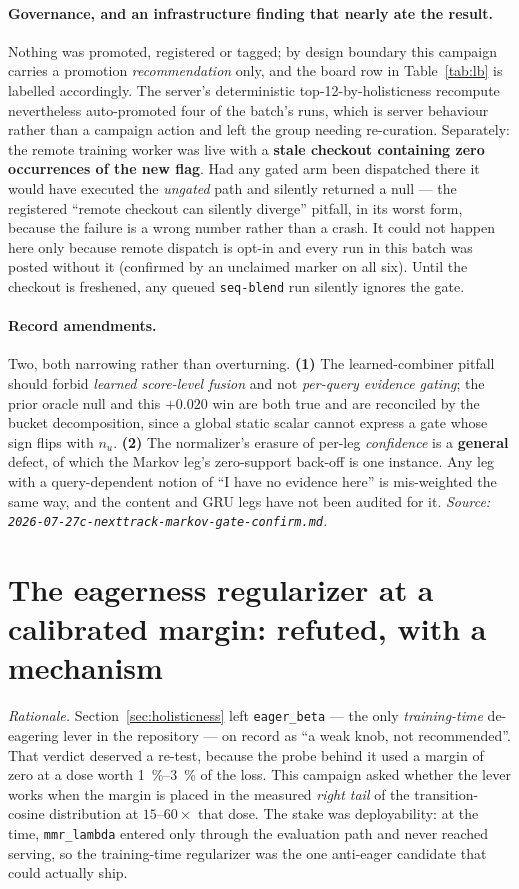 \documentclass[11pt]{article}
\begin{document}
\paragraph{Governance, and an infrastructure finding that nearly ate the result.}
Nothing was promoted, registered or tagged; by design boundary this campaign
carries a promotion \emph{recommendation} only, and the board row in
Table~\ref{tab:lb} is labelled accordingly. The server's deterministic
top-12-by-holisticness recompute nevertheless auto-promoted four of the batch's
runs, which is server behaviour rather than a campaign action and left the group
needing re-curation. Separately: the remote training worker was live with a
\textbf{stale checkout containing zero occurrences of the new flag}. Had any gated
arm been dispatched there it would have executed the \emph{ungated} path and
silently returned a null --- the registered ``remote checkout can silently diverge''
pitfall, in its worst form, because the failure is a wrong number rather than a
crash. It could not happen here only because remote dispatch is opt-in and every
run in this batch was posted without it (confirmed by an unclaimed marker on all
six). Until the checkout is freshened, any queued \texttt{seq-blend} run silently
ignores the gate.

\paragraph{Record amendments.} Two, both narrowing rather than overturning.
\textbf{(1)} The learned-combiner pitfall should forbid \emph{learned score-level
fusion} and not \emph{per-query evidence gating}; the prior oracle null and this
$+\num{0.020}$ win are both true and are reconciled by the bucket decomposition,
since a global static scalar cannot express a gate whose sign flips with $n_u$.
\textbf{(2)} The normalizer's erasure of per-leg \emph{confidence} is a
\textbf{general} defect, of which the Markov leg's zero-support back-off is one
instance. Any leg with a query-dependent notion of ``I have no evidence here'' is
mis-weighted the same way, and the content and GRU legs have not been audited for
it.
\emph{Source: \texttt{2026-07-27c-nexttrack-markov-gate-confirm.md}.}

\section{The eagerness regularizer at a calibrated margin: refuted, with a mechanism}
\label{sec:eagermargin}
\emph{Rationale.} Section~\ref{sec:holisticness} left \texttt{eager\_beta} --- the
only \emph{training-time} de-eagering lever in the repository --- on record as ``a
weak knob, not recommended''. That verdict deserved a re-test, because the probe
behind it used a margin of zero at a dose worth \SIrange{1}{3}{\percent} of the
loss. This campaign asked whether the lever works when the margin is placed in the
measured \emph{right tail} of the transition-cosine distribution at
$\numrange{15}{60}\times$ that dose. The stake was deployability: at the time,
\texttt{mmr\_lambda} entered only through the evaluation path and never reached
serving, so the training-time regularizer was the one anti-eager candidate that
could actually ship.
\end{document}
